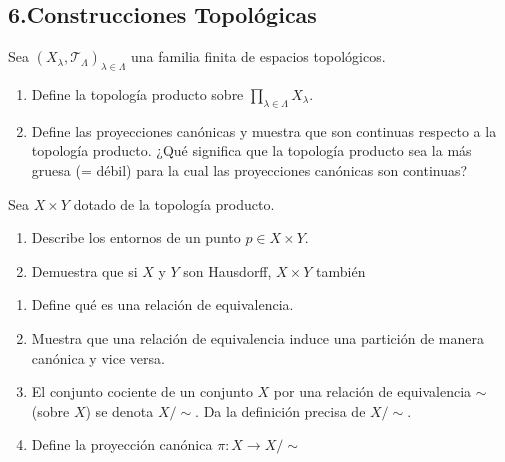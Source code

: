 \documentclass[b5paper,10pt,twoside]{book}
\begin{document}
\subsection*{6.\enspace Construcciones Topológicas }

\begin{problem}
Sea \((X_\lambda, \mathcal{T}_\Lambda)_{\lambda\in\Lambda}\)
una familia finita de espacios topológicos.
\begin{enumerate}[label=(\roman*)]
\item Define 
la topología producto sobre \(\prod\limits_{\lambda\in\Lambda} X_\lambda\).

\item Define las proyecciones canónicas y muestra que son continuas respecto a la topología producto. ¿Qué significa que la topología producto sea la más gruesa (= débil) para la cual las proyecciones canónicas son continuas?
\end{enumerate}

\end{problem}

 
\begin{problem}
Sea \(X\times Y\) dotado de la topología 
producto.
\begin{enumerate}[label=(\roman*)]
\item Describe los entornos  de un punto  \(p\in X\times Y\).
\item Demuestra que si \(X\) y \(Y\) son Hausdorff, \(X\times Y\) también
\end{enumerate}

\end{problem}

\begin{problem}\hfill\null
\begin{enumerate}[label=(\roman*)]
\item Define qué es una relación de equivalencia.
\item Muestra que una relación de equivalencia induce una partición de manera canónica y vice versa.
\item El conjunto cociente de un conjunto \(X\) por una relación de equivalencia \(\sim\) (sobre \(X\)) se denota \(X/\!\!\sim\). Da la definición precisa de \(X/\!\!\sim\).
\item Define la proyección canónica \(\pi\colon X\to X/\!\!\sim\)
\end{enumerate}
\end{problem}
\end{document}
